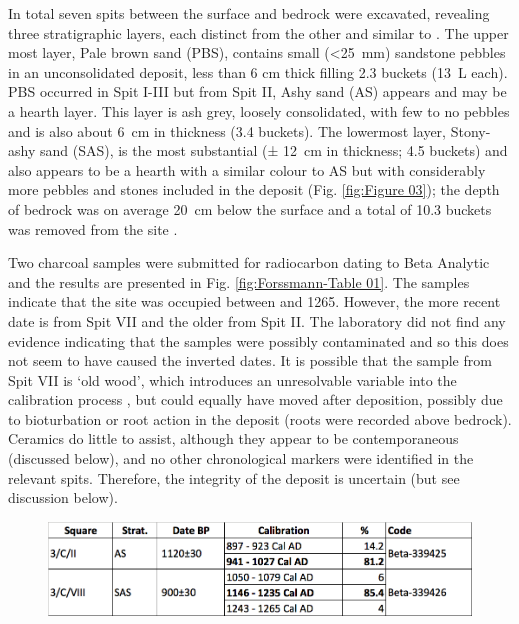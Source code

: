 In total seven spits between the surface and bedrock were excavated, revealing three stratigraphic layers, each distinct from the other and similar to \textcite['s]{Walker_1994}. 
The upper most layer, Pale brown sand (PBS), contains small (<\SI{25}{\milli\meter}) sandstone pebbles in an unconsolidated deposit, less than 6 cm thick filling 2.3 buckets (\SI{13}{\liter} each). 
PBS occurred in Spit I-III but from Spit II, Ashy sand (AS) appears and may be a hearth layer. This layer is ash grey, loosely consolidated, with few to no pebbles and is also about \SI{6}{\centi\meter} in thickness (3.4 buckets). 
The lowermost layer, Stony-ashy sand (SAS), is the most substantial (± \SI{12}{\centi\meter} in thickness; 4.5 buckets) and also appears to be a hearth with a similar colour to AS but with considerably more pebbles and stones included in the deposit (Fig. \ref{fig:Figure 03}); the depth of bedrock was on average \SI{20}{\centi\meter} below the surface and a total of 10.3 buckets was removed from the site \parencite[for more details see][95]{Forssman_2014a}. 

Two charcoal samples were submitted for radiocarbon dating to Beta Analytic and the results are presented in Fig. \ref{fig:Forssmann-Table 01}. The samples indicate that the site was occupied between  and 1265. However, the more recent date is from Spit VII and the older from Spit II. The laboratory did not find any evidence indicating that the samples were possibly contaminated and so this does not seem to have caused the inverted dates. It is possible that the sample from Spit VII is ‘old wood’, which introduces an unresolvable variable into the calibration process \parencite{Kennett_2002}, but could equally have moved after deposition, possibly due to bioturbation \parencite[see][]{Lancaster_2003} or root action in the deposit (roots were recorded above bedrock). Ceramics do little to assist, although they appear to be contemporaneous (discussed below), and no other chronological markers were identified in the relevant spits. Therefore, the integrity of the deposit is uncertain (but see discussion below).

	\begin{figure} %
		\includegraphics[width=\linewidth]{figures/Forssman-Table01}
		\label{fig:Forssmann-Table01}
	\end{figure}

